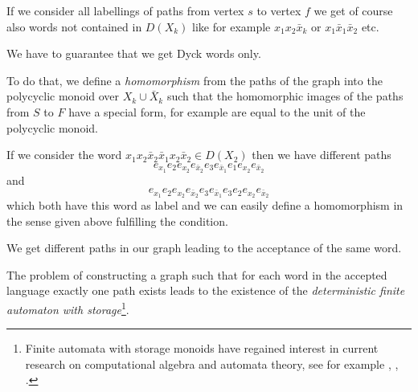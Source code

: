 If we consider all labellings of paths from vertex $s$ to vertex $f$ we get of
course also words not contained in $D(X_k)$ like for example $x_1 x_2
\bar{x}_k$ or $x_1 \bar{x}_1 \bar{x}_2$ etc.

We have to guarantee that we get Dyck words only. 

To do that, we define a {\em homomorphism} from the paths of the graph into the
polycyclic monoid over $X_k \cup \bar{X}_k$ such that the homomorphic images of
the paths from $S$ to $F$ have a special form, for example are equal to the unit
of the polycyclic monoid.

If we consider the word $ x_1 x_2 \bar{x}_2 \bar{x}_1 x_2 \bar{x}_2 \in D(X_2)$
then we have different paths 
\[e_{x_1} e_2 e_{x_2} e_{\bar{x}_2} e_3 e_{\bar{x}_1} e_1 e_{x_2} e_{\bar{x}_2} \] 
and 
\[e_{x_1} e_2 e_{x_2} e_{\bar{x}_2} e_3 e_{\bar{x}_1} e_3 e_2 e_{x_2}
e_{\bar{x}_2}\] 
which both have this word as label and we can easily define a homomorphism in
the sense given above fulfilling the condition.

We get different paths in our graph leading to the acceptance of the same word.

The problem of constructing a graph such that for each word in the accepted
language exactly one path exists leads to the existence of the {\em
deterministic finite automaton with storage}\footnote{Finite automata with 
storage monoids have regained interest in current research on computational
algebra and automata theory, see for example \cite{doi:10.1080/00927870802243580},
 \cite{Render}, \cite{Zetzsche2016d}.}.

